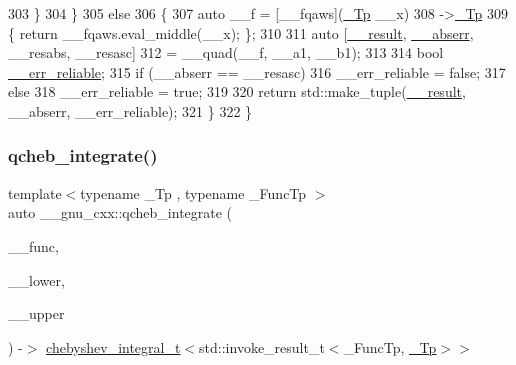 \begin{DoxyCode}
303             \}
304         \}
305       \textcolor{keywordflow}{else}
306         \{
307           \textcolor{keyword}{auto} \_\_f = [\_\_fqaws](\hyperlink{namespace____gnu__cxx_a3b19a9c800ca194374ef9172290f7d79}{\_Tp} \_\_x)
308                      ->\hyperlink{namespace____gnu__cxx_a3b19a9c800ca194374ef9172290f7d79}{\_Tp}
309                      \{ \textcolor{keywordflow}{return} \_\_fqaws.eval\_middle(\_\_x); \};
310 
311           \textcolor{keyword}{auto} [\hyperlink{namespace____gnu__cxx_a500ea9f53aeaecd8c2ae657503450578}{\_\_result}, \hyperlink{namespace____gnu__cxx_a72f736cff127f1574e91a301de9e074b}{\_\_abserr}, \_\_resabs, \_\_resasc]
312             = \_\_quad(\_\_f, \_\_a1, \_\_b1);
313 
314           \textcolor{keywordtype}{bool} \hyperlink{namespace____gnu__cxx_a989f5db5dc6da4eeca54cd1f93ec82ee}{\_\_err\_reliable};
315           \textcolor{keywordflow}{if} (\_\_abserr == \_\_resasc)
316             \_\_err\_reliable = \textcolor{keyword}{false};
317           \textcolor{keywordflow}{else}
318             \_\_err\_reliable = \textcolor{keyword}{true};
319 
320           \textcolor{keywordflow}{return} std::make\_tuple(\hyperlink{namespace____gnu__cxx_a500ea9f53aeaecd8c2ae657503450578}{\_\_result}, \_\_abserr, \_\_err\_reliable);
321         \}
322     \}
\end{DoxyCode}
\mbox{\label{namespace____gnu__cxx_aa8e32fefb92558e0c8ddb94c25fd637b}} 
\subsubsection{\texorpdfstring{qcheb\+\_\+integrate()}{qcheb\_integrate()}}
{\footnotesize\ttfamily template$<$typename \+\_\+\+Tp , typename \+\_\+\+Func\+Tp $>$ \\
auto \+\_\+\+\_\+gnu\+\_\+cxx\+::qcheb\+\_\+integrate (\begin{DoxyParamCaption}\item[{\+\_\+\+Func\+Tp}]{\+\_\+\+\_\+func,  }\item[{\hyperlink{namespace____gnu__cxx_a3b19a9c800ca194374ef9172290f7d79}{\+\_\+\+Tp}}]{\+\_\+\+\_\+lower,  }\item[{\hyperlink{namespace____gnu__cxx_a3b19a9c800ca194374ef9172290f7d79}{\+\_\+\+Tp}}]{\+\_\+\+\_\+upper }\end{DoxyParamCaption}) -\/$>$ \hyperlink{struct____gnu__cxx_1_1chebyshev__integral__t}{chebyshev\+\_\+integral\+\_\+t}$<$std\+::invoke\+\_\+result\+\_\+t$<$\+\_\+\+Func\+Tp, \hyperlink{namespace____gnu__cxx_a3b19a9c800ca194374ef9172290f7d79}{\+\_\+\+Tp}$>$$>$
    }



